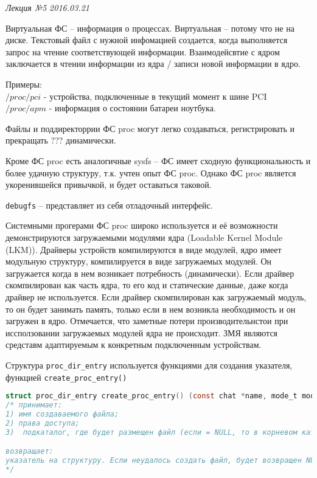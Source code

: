 \clearpage
\begin{flushright}
	\textit{Лекция №5}
	\textit{2016.03.21}
\end{flushright}

Виртуальная ФС – информация о процессах. Виртуальная – потому что не на диске. Текстовый файл с нужной инфомацией создается, когда выполняется запрос на чтение соответствующей информации.
Взаимодейсвтие с ядром заключается в чтении информации из ядра / записи новой информации в ядро.

Примеры:\\
$/proc/pci$ - устройства, подключенные в текущий момент к шине PCI\\
$/proc/apm$ - информация о состоянии батареи ноутбука.

Файлы и поддиректоррии ФС proc могут легко создаваться, регистрировать и прекращать ??? динамически. 

Кроме ФС proc есть аналогичные sysfs – ФС имеет сходную функциональность и более удачную структуру, т.к. учтен опыт ФС  proc. Однако ФС proc является укоренившейся привычкой, и будет оставаться таковой.

\verb|debugfs| – представляет из себя отладочный интерфейс.

Системными прогерами ФС proc широко используется и её возможности демонстрируются загружаемыми модулями ядра (Loadable Kernel Module (LKM)).
Драйверы устройств компилируются в виде модулей, ядро имеет модульную структуру, компилируется в виде загружаемых модулей. Он загружается когда в нем возникает потребность (динамически). Если драйвер скомпилирован как часть ядра, то его код и статические данные, даже когда драйвер не используется. Если драйвер скомпилирован как загружаемый модуль, то он будет занимать память, только если в нем возникла необходимость и он загружен в ядро. Отмечается, что заметные потери производительнстои при иссползовании загружаемых модулей ядра не происходит. ЗМЯ являются средставм адаптируемым к конкретным подключенным устройствам. 

 

Структура \verb|proc_dir_entry| используется функциями для создания указателя, функцией \verb|create_proc_entry()|

\begin{lstlisting}[language=c]
struct proc_dir_entry create_proc_entry() (const chat *name, mode_t mode, struct proc_dir_entry *base);
/* принимает:
1) имя создаваемого файла;
2) права доступа;
3)  подкаталог, где будет размещен файл (если = NULL, то в корневом каталоге proc); 

возвращает:
указатель на структуру. Если неудалось создать файл, будет возвращен NULL.
*/
\end{lstlisting}

